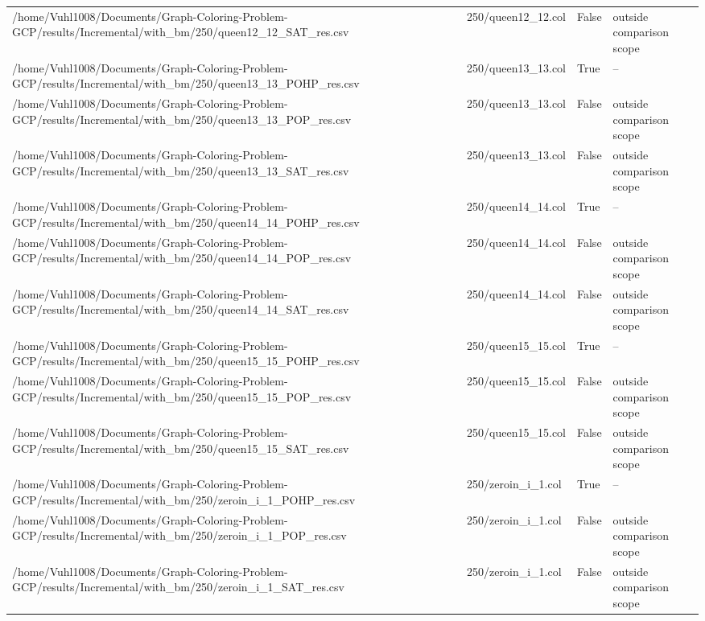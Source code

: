 \begin{table}[htbp]
\begin{tabular}{llll}
/home/Vuhl1008/Documents/Graph-Coloring-Problem-GCP/results/Incremental/with\_bm/250/queen12\_12\_SAT\_res.csv & 250/queen12\_12.col & False & outside comparison scope \\
/home/Vuhl1008/Documents/Graph-Coloring-Problem-GCP/results/Incremental/with\_bm/250/queen13\_13\_POHP\_res.csv & 250/queen13\_13.col & True & -- \\
/home/Vuhl1008/Documents/Graph-Coloring-Problem-GCP/results/Incremental/with\_bm/250/queen13\_13\_POP\_res.csv & 250/queen13\_13.col & False & outside comparison scope \\
/home/Vuhl1008/Documents/Graph-Coloring-Problem-GCP/results/Incremental/with\_bm/250/queen13\_13\_SAT\_res.csv & 250/queen13\_13.col & False & outside comparison scope \\
/home/Vuhl1008/Documents/Graph-Coloring-Problem-GCP/results/Incremental/with\_bm/250/queen14\_14\_POHP\_res.csv & 250/queen14\_14.col & True & -- \\
/home/Vuhl1008/Documents/Graph-Coloring-Problem-GCP/results/Incremental/with\_bm/250/queen14\_14\_POP\_res.csv & 250/queen14\_14.col & False & outside comparison scope \\
/home/Vuhl1008/Documents/Graph-Coloring-Problem-GCP/results/Incremental/with\_bm/250/queen14\_14\_SAT\_res.csv & 250/queen14\_14.col & False & outside comparison scope \\
/home/Vuhl1008/Documents/Graph-Coloring-Problem-GCP/results/Incremental/with\_bm/250/queen15\_15\_POHP\_res.csv & 250/queen15\_15.col & True & -- \\
/home/Vuhl1008/Documents/Graph-Coloring-Problem-GCP/results/Incremental/with\_bm/250/queen15\_15\_POP\_res.csv & 250/queen15\_15.col & False & outside comparison scope \\
/home/Vuhl1008/Documents/Graph-Coloring-Problem-GCP/results/Incremental/with\_bm/250/queen15\_15\_SAT\_res.csv & 250/queen15\_15.col & False & outside comparison scope \\
/home/Vuhl1008/Documents/Graph-Coloring-Problem-GCP/results/Incremental/with\_bm/250/zeroin\_i\_1\_POHP\_res.csv & 250/zeroin\_i\_1.col & True & -- \\
/home/Vuhl1008/Documents/Graph-Coloring-Problem-GCP/results/Incremental/with\_bm/250/zeroin\_i\_1\_POP\_res.csv & 250/zeroin\_i\_1.col & False & outside comparison scope \\
/home/Vuhl1008/Documents/Graph-Coloring-Problem-GCP/results/Incremental/with\_bm/250/zeroin\_i\_1\_SAT\_res.csv & 250/zeroin\_i\_1.col & False & outside comparison scope \\

\end{tabular}
\end{table}
